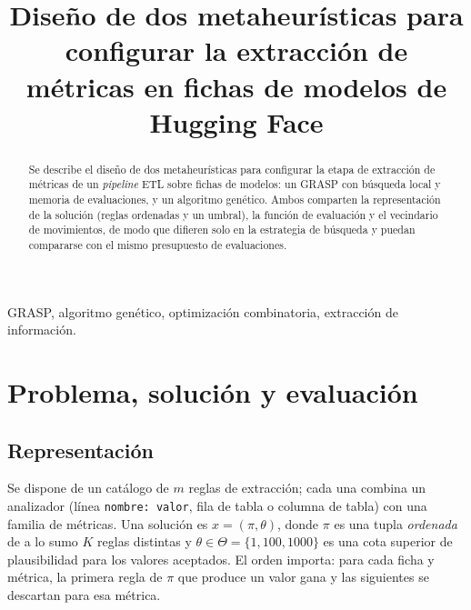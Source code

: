\documentclass[conference]{IEEEtran}
\begin{document}
	
	\title{Dise\~no de dos metaheur\'isticas para configurar la extracci\'on de m\'etricas en fichas de modelos de Hugging Face}
	
	\author{
		}
	
	\maketitle
	
	\begin{abstract}
		Se describe el dise\~no de dos metaheur\'isticas para configurar la etapa de extracci\'on de m\'etricas de un \emph{pipeline} ETL sobre fichas de modelos: un GRASP con b\'usqueda local y memoria de evaluaciones, y un algoritmo gen\'etico. Ambos comparten la representaci\'on de la soluci\'on (reglas ordenadas y un umbral), la funci\'on de evaluaci\'on y el vecindario de movimientos, de modo que difieren solo en la estrategia de b\'usqueda y puedan compararse con el mismo presupuesto de evaluaciones.
	\end{abstract}
	
	\begin{IEEEkeywords}
		GRASP, algoritmo gen\'etico, optimizaci\'on combinatoria, extracci\'on de informaci\'on.
	\end{IEEEkeywords}
	
	\section{Problema, soluci\'on y evaluaci\'on}
	
	\subsection{Representaci\'on}
	Se dispone de un cat\'alogo de $m$ reglas de extracci\'on; cada una combina un analizador (l\'inea \texttt{nombre: valor}, fila de tabla o columna de tabla) con una familia de m\'etricas. Una soluci\'on es $x=(\pi,\theta)$, donde $\pi$ es una tupla \emph{ordenada} de a lo sumo $K$ reglas distintas y $\theta\in\Theta=\{1,100,1000\}$ es una cota superior de plausibilidad para los valores aceptados. El orden importa: para cada ficha y m\'etrica, la primera regla de $\pi$ que produce un valor gana y las siguientes se descartan para esa m\'etrica.
	
\end{document}

